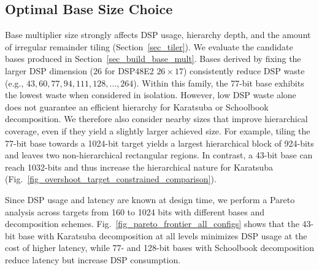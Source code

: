 \documentclass[sigconf,9pt,review]{acmart}
\begin{document}


    


\subsection{Optimal Base Size Choice}
Base multiplier size strongly affects DSP usage, hierarchy depth, and the amount of irregular remainder tiling (Section~\ref{sec_tiler}).
We evaluate the candidate bases produced in Section~\ref{sec_build_base_mult}.
Bases derived by fixing the larger DSP dimension ($26$ for DSP48E2 $26\times17$) consistently reduce DSP waste (e.g., $43, 60, 77, 94, 111, 128, \dots, 264$).
Within this family, the 77-bit base exhibits the lowest waste when considered in isolation.
However, low DSP waste alone does not guarantee an efficient hierarchy for Karatsuba or Schoolbook decomposition.
We therefore also consider nearby sizes that improve hierarchical coverage, even if they yield a slightly larger achieved size.
For example, tiling the 77-bit base towards a 1024-bit target yields a largest hierarchical block of 924-bits and leaves two non-hierarchical rectangular regions.
In contrast, a 43-bit base can reach 1032-bits and thus increase the hierarchical nature for Karatsuba (Fig.~\ref{fig_overshoot_target_constrained_comparison}).

Since DSP usage and latency are known at design time, we perform a Pareto analysis across targets from 160 to 1024 bits with different bases and decomposition schemes.
Fig.~\ref{fig_pareto_frontier_all_configs} shows that the 43-bit base with Karatsuba decomposition at all levels minimizes DSP usage at the cost of higher latency, while 77- and 128-bit bases with Schoolbook decomposition reduce latency but increase DSP consumption.
\end{document}
